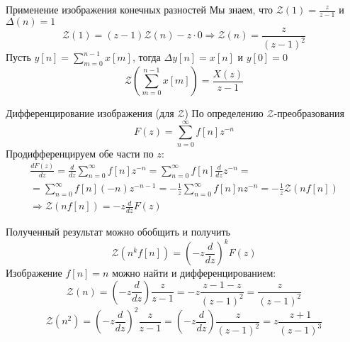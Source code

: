 \documentclass[12pt,twoside]{report}
\theoremstyle{MyNonumberplain}
\begin{document}
        \begin{frame}{Применение изображения конечных разностей}
            Мы знаем, что $\displaystyle \mathcal{Z}(1)=\frac{z}{z-1}$ и $\Delta(n)=1$
                $$\mathcal{Z}(1)=(z-1) \mathcal{Z}(n) - z\cdot0 \Rightarrow \mathcal{Z}(n)=\frac{z}{(z-1)^2}$$
            Пусть $\displaystyle y[n]=\sum_{m=0}^{n-1}x[m]$, тогда $\Delta y[n]=x[n]$ и $y[0]=0$
                $$ \mathcal{Z}\left(\sum_{m=0}^{n-1}x[m]\right)=\frac{X(z)}{z-1}$$
        \end{frame}
    
        \begin{frame}{Дифференцирование изображения (для $\mathcal{Z}$)}
            По определению $\mathcal{Z}$-преобразования
            $$ F(z) = \sum_{n=0}^{\infty} f[n]z^{-n}$$
            Продифференцируем обе части по $z$: 
            \[\begin{aligned}
                \frac{dF(z)}{dz}=\frac{d}{dz}\sum_{n=0}^{\infty} f[n]z^{-n}
                = \sum_{n=0}^{\infty} f[n]\frac{d}{dz}z^{-n}= \\ 
                = \sum_{n=0}^{\infty} f[n](-n)z^{-n-1}  = -\frac{1}{z}\sum_{n=0}^{\infty} f[n]nz^{-n} 
                = -\frac{1}{z}\mathcal{Z}\left(nf[n]\right)\\ 
                \Rightarrow \mathcal{Z}\left(nf[n]\right) = -z\frac{d}{dz}F(z)
            \end{aligned}\]
        \end{frame}
    
            Полученный результат можно обобщить и получить
                $$ \mathcal{Z}\left(n^kf[n]\right) = \left(-z\frac{d}{dz}\right)^k F(z)$$
                Изображение $f[n]=n$ можно найти и дифференцированием:\\
                $$\mathcal{Z}\left(n\right) = \left(-z\frac{d}{dz}\right)\frac{z}{z-1}=
                -z\frac{z-1-z}{(z-1)^2}=\frac{z}{(z-1)^2}$$
                $$\mathcal{Z}\left(n^2\right) = \left(-z\frac{d}{dz}\right)^2\frac{z}{z-1}=
                \left(-z\frac{d}{dz}\right)\frac{z}{(z-1)^2}=z\frac{z+1}{(z-1)^3}$$
    
\end{document}
